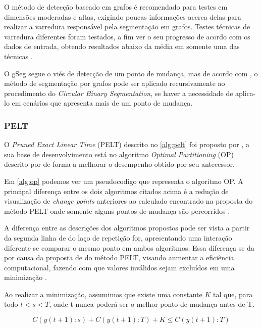 O método de detecção baseado em grafos é recomendado para testes em dimensões moderadas e altas, exigindo poucas informações acerca delas para realizar a varredura responsável pela segmentação em grafos. Testes técnicas de varredura diferentes foram testados, a fim ver o seu progresso de acordo com os dados de entrada, obtendo resultados abaixo da média em somente uma das técnicas \cite{Chen2015}. 

O gSeg segue o viés de detecção de um ponto de mudança, mas de acordo com \cite{Chen2015}, o método de segmentação por grafos pode ser aplicado recursivamente ao procedimento do \textit{Circular Binary Segmentation}, se haver a necessidade de aplica-lo em cenários que apresenta mais de um ponto de mudança.


\subsubsection{PELT}

O \textit{Pruned Exact Linear Time} (PELT) descrito no \autoref{alg:pelt} foi proposto por \cite{Killick2012}, a sua base de desenvolvimento está no algoritmo \textit{Optimal Partitioning} (OP) descrito por \cite{Gioumousis2005} de forma a melhorar o desempenho obtido por seu antecessor. 

Em \autoref{alg:op} podemos ver um pseudocodigo que representa o algoritmo OP. A principal diferença entre os dois algoritmos citados acima é a redução de visualização de \textit{change points} anteriores ao calculado encontrado na proposta do método PELT onde somente alguns pontos de mudança são percorridos \cite{BenedicteBakka2018}. 

 
 

A diferença entre as descrições dos algoritmos propostos pode ser vista a partir da segunda linha de do laço de repetição for, apresentando uma interação diferente se comparar o mesmo ponto em ambos algoritmos. Essa diferença se da por causa da proposta de do método PELT, visando aumentar a eficiência computacional, fazendo com que valores inválidos sejam excluídos em uma minimização \cite{Killick2012}. 

Ao realizar a minimização, assumimos que existe uma constante $K$ tal que, para todo $t < s < T$, onde t nunca poderá ser o melhor ponto de mudança antes de T. 

\[C\left ( y\left ( t+1 \right ):s \right ) + C\left ( y\left ( t+1 \right ):T \right ) + K \leq C\left ( y\left ( t+1 \right ):T \right )\]


